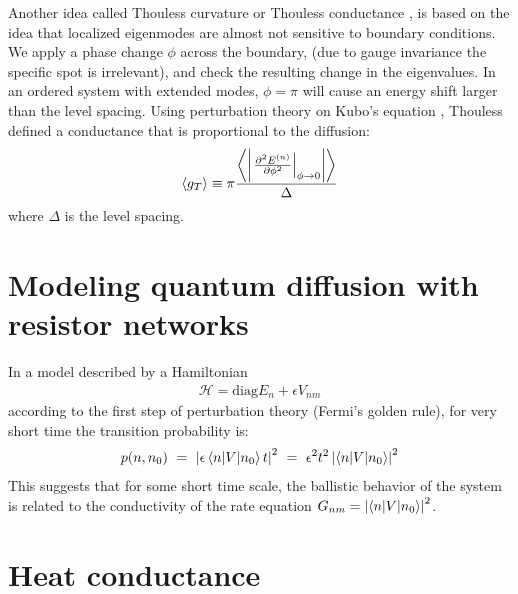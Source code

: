 Another idea called Thouless curvature or Thouless conductance 
\cite{edwards_numerical_1972,thouless_electrons_1974,braun_level_1997}, is based
on the idea that localized eigenmodes are almost not sensitive to boundary conditions. We apply a 
phase change $\phi$ across the boundary, (due to gauge invariance the specific spot is irrelevant),
and check the resulting change in the eigenvalues. 
In an ordered system with extended modes, $\phi=\pi$ will cause an energy
shift larger than the level spacing. 
Using perturbation theory on Kubo's equation \cite{kubo_statistical-mechanical_1957},
Thouless defined a conductance that is proportional to the diffusion: 
\begin{align}\label{eq:thouless}
\left\langle g_T\right\rangle  \equiv \pi \frac{\left\langle \left|\left. \frac{\partial ^2 E^{(n)}}{\partial \phi^2}\right|_{\phi\rightarrow 0}\right|\right\rangle}{\Delta}
\end{align}
where $\Delta$ is the level spacing.




\section{Modeling quantum diffusion with resistor networks}


In a model described by a Hamiltonian 
%
\begin{align}
\mathcal{H} = \textrm{diag}{E_n} + \epsilon {V_{nm}}
\end{align}
%
according to the first step of perturbation theory (Fermi's golden rule),
for very short time the transition probability is:
%
\begin{align}
 p(n, n_0)\ =\ \left| \epsilon \bra n| V |n_0\ket t\right|^2 \ = \ \epsilon^2 t^2\left| \bra n| V |n_0\ket \right|^2
\end{align}
%
This suggests that for some short time scale, the ballistic behavior
of the system is related to the conductivity of the rate equation $G_{nm} = \left| \left\langle n| V |n_0\right\rangle \right|^2$.





\section{Heat conductance}\label{sec:heat}

